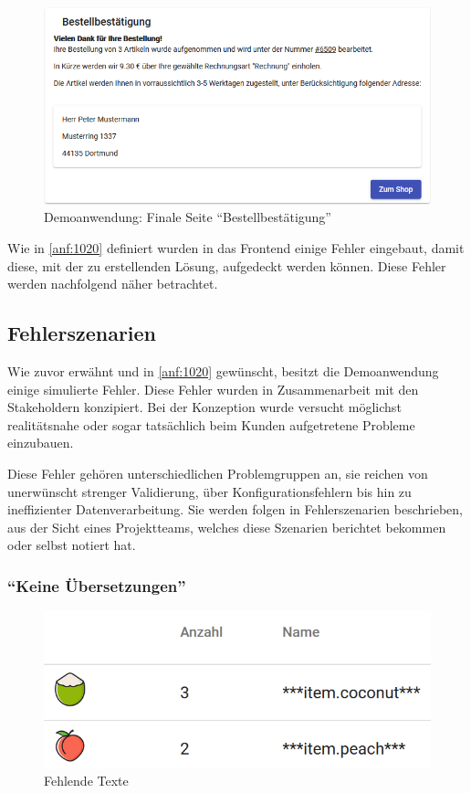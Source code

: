 \begin{figure}[H]
	\centering
	\includegraphics[width=0.75\linewidth]{img/04_erstellung-poc/demoanwendung_vorstellung_06-bestellbestaetigung.png}
	\caption{Demoanwendung: Finale Seite \enquote{Bestellbestätigung}}
	\label{fig:demoanwendung_vorstellung_06-bestellbestaetigung}
\end{figure}

Wie in \autoref{anf:1020} definiert wurden in das Frontend einige Fehler eingebaut, damit diese, mit der zu erstellenden Lösung, aufgedeckt werden können. Diese Fehler werden nachfolgend näher betrachtet.

\subsection{Fehlerszenarien}
\label{subsec:fehlerszenarien}

Wie zuvor erwähnt und in \autoref{anf:1020} gewünscht, besitzt die Demoanwendung einige simulierte Fehler. Diese Fehler wurden in Zusammenarbeit mit den Stakeholdern konzipiert. Bei der Konzeption wurde versucht möglichst realitätsnahe oder sogar tatsächlich beim Kunden aufgetretene Probleme einzubauen.

Diese Fehler gehören unterschiedlichen Problemgruppen an, sie reichen von unerwünscht strenger Validierung, über Konfigurationsfehlern bis hin zu ineffizienter Datenverarbeitung. Sie werden folgen in Fehlerszenarien beschrieben, aus der Sicht eines Projektteams, welches diese Szenarien berichtet bekommen oder selbst notiert hat.

\subsubsection{\enquote{Keine Übersetzungen}}

\begin{figure}
\centering
\vspace{-\baselineskip}
\includegraphics[width=\linewidth]{img/04_erstellung-poc/demoanwendung_fehlerszenario-uebersetzungen}
\caption{Fehlende Texte}
\label{fig:demoanwendung_fehlerszenario-uebersetzungen}
\end{figure}

